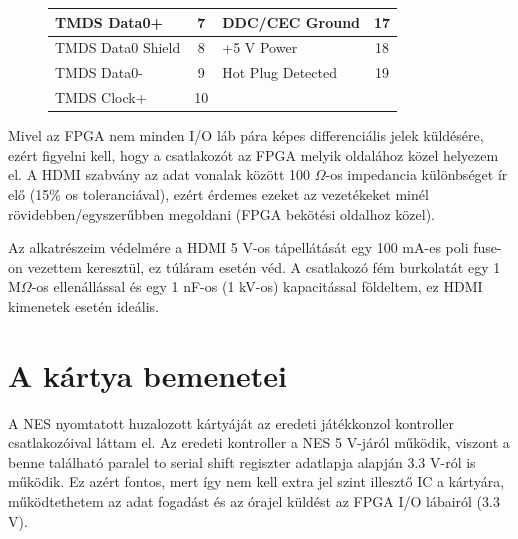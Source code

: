 \begin{figure}[H]
\begin{minipage}[]{\textwidth}
\begin{minipage}[b]{0.59\textwidth}
\begin{tabular}{|l|c|l|c|}
				TMDS Data0+       & 7                                                                                & DDC/CEC Ground    & 17                                                                               \\ \hline
				TMDS Data0 Shield & 8                                                                                & +5 V Power        & 18                                                                               \\ \hline
				TMDS Data0-       & 9                                                                                & Hot Plug Detected & 19                                                                               \\ \hline
				TMDS Clock+       & 10                                                                               &                   & \multicolumn{1}{l|}{}                                                            \\ \hline
			\end{tabular}
			\label{tab:HDMI-pinout}
		\end{minipage}
	\end{minipage}
	\end{figure} 
	
	Mivel az FPGA nem minden I/O láb pára képes differenciális jelek küldésére, ezért figyelni kell, hogy a csatlakozót az FPGA melyik oldalához közel helyezem el. A HDMI szabvány az adat vonalak között 100 $\Omega$-os impedancia különbséget ír elő (15\% os toleranciával), ezért érdemes ezeket az vezetékeket minél rövidebben/egyszerűbben megoldani (FPGA bekötési oldalhoz közel). 
	
	Az alkatrészeim védelmére a HDMI 5 V-os tápellátását egy 100 mA-es poli fuse-on vezettem keresztül, ez túláram esetén véd. A csatlakozó fém burkolatát egy 1 M$\Omega$-os ellenállással és egy 1 nF-os (1 kV-os) kapacitással földeltem, ez HDMI kimenetek esetén ideális. 
	
\section{A kártya bemenetei}
	
	A NES nyomtatott huzalozott kártyáját az eredeti játékkonzol kontroller csatlakozóival láttam el. Az eredeti kontroller a NES 5 V-járól működik, viszont a benne található paralel to serial shift regiszter adatlapja alapján 3.3 V-ról is működik. Ez azért fontos, mert így nem kell extra jel szint illesztő IC a kártyára, működtethetem az adat fogadást és az órajel küldést az FPGA I/O lábairól (3.3 V).
	
